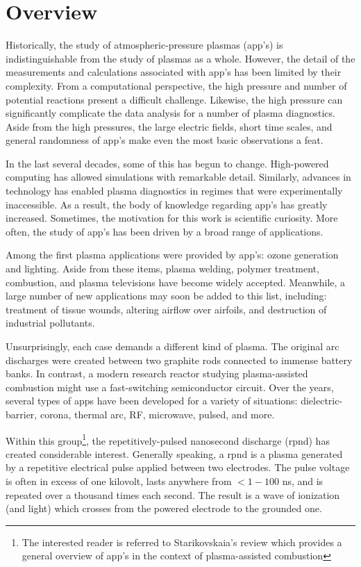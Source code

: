 \section{Overview}

Historically, the study of atmospheric-pressure plasmas (\acs{app}'s) is
indistinguishable from the study of plasmas as a whole. However, the detail of
the measurements and calculations associated with \acs{app}'s has been limited
by their complexity. From a computational perspective, the high pressure and
number of potential reactions present a difficult challenge. Likewise, the high
pressure can significantly complicate the data analysis for a number of plasma
diagnostics. Aside from the high pressures, the large electric fields, short
time scales, and general randomness of \acs{app}'s make even the most basic
observations a feat.

In the last several decades, some of this has begun to change. High-powered
computing has allowed simulations with remarkable detail. Similarly, advances in
technology has enabled plasma diagnostics in regimes that were experimentally
inaccessible. As a result, the body of knowledge regarding \acs{app}'s has
greatly increased. Sometimes, the motivation for this work is scientific
curiosity. More often, the study of \acs{app}'s has been driven by a broad range
of applications.

Among the first plasma applications were provided by \acs{app}'s: ozone
generation and lighting. Aside from these items, plasma welding, polymer
treatment, combustion, and plasma televisions have become widely accepted.
Meanwhile, a large number of new applications may soon be added to this list,
including: treatment of tissue wounds, altering airflow over airfoils, and
destruction of industrial pollutants.

Unsurprisingly, each case demands a different kind of plasma. The original arc
discharges were created between two graphite rods connected to immense battery
banks. In contrast, a modern research reactor studying plasma-assisted
combustion might use a fast-switching semiconductor circuit. Over the years,
several types of \acs{app}s have been developed for a variety of situations:
dielectric-barrier, corona, thermal arc, RF, microwave, pulsed, and more.

Within this group\footnote{The interested reader is referred to Starikovskaia's
review \cite{Starikovskaia2006} which provides a general overview of \acs{app}'s
in the context of plasma-assisted combustion}, the repetitively-pulsed
nanosecond discharge (\acs{rpnd}) has created considerable interest. Generally
speaking, a \acs{rpnd} is a plasma generated by a repetitive electrical pulse
applied between two electrodes. The pulse voltage is often in excess of one
kilovolt, lasts anywhere from $<1-100$ ns, and is repeated over a thousand
times each second. The result is a wave of ionization (and light) which crosses
from the powered electrode to the grounded one.

